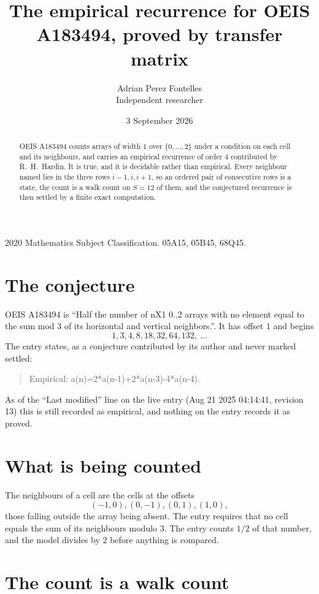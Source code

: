 \documentclass[11pt,a4paper]{article}
\title{The empirical recurrence for OEIS A183494, proved by transfer matrix}
\author{Adrian Perez Fontelles\\ \small Independent researcher}
\date{3 September 2026}
\theoremstyle{plain}
\theoremstyle{definition}
\begin{document}
\maketitle

\begin{abstract}
OEIS A183494 counts arrays of width $1$ over $\{0,\dots,2\}$ under a condition on each cell
and its neighbours, and carries an empirical recurrence of order $4$ contributed by
R.~H.~Hardin. It is true, and it is decidable rather than empirical. Every neighbour named lies
in the three rows $i-1,i,i+1$, so an ordered pair of consecutive rows is a state, the count is
a walk count on $S=12$ of them, and the conjectured recurrence is then settled by a finite
exact computation.
\end{abstract}

\noindent\small 2020 Mathematics Subject Classification. 05A15, 05B45, 68Q45.\normalsize

\section{The conjecture}

OEIS A183494 is ``Half the number of nX1 0..2 arrays with no element equal to the sum mod 3 of its horizontal and vertical neighbors.''. It has offset $1$ and begins
\[
1, 3, 4, 8, 18, 32, 64, 132,\ \dots
\]
The entry states, as a conjecture contributed by its author and never marked settled:
\begin{quote}
Empirical: a(n)=2*a(n-1)+2*a(n-3)-4*a(n-4).
\end{quote}
As of the ``Last modified'' line on the live entry (Aug 21 2025 04:14:41, revision 13) this is still
recorded as empirical, and nothing on the entry records it as proved.

\section{What is being counted}

The neighbours of a cell are the cells at the offsets
\[
(-1,0), (0,-1), (0,1), (1,0),
\]
those falling outside the array being absent. The entry requires that no cell equals the sum of its neighbours modulo $3$. The entry counts $1/2$ of that number, and the model divides by $2$ before anything is compared.

\section{The count is a walk count}
\end{document}
